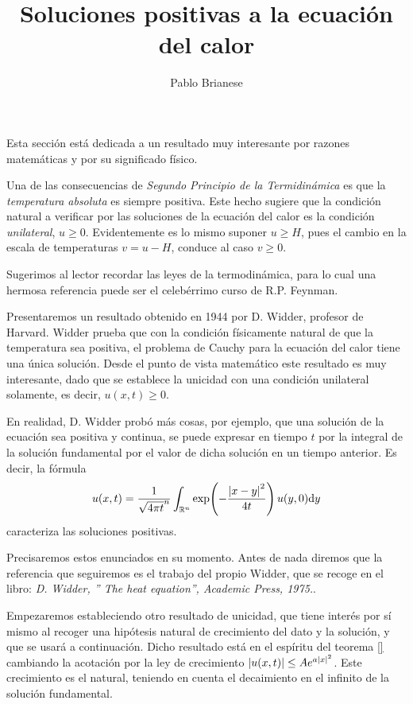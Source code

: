 \documentclass{article}
\title{Soluciones positivas a la ecuación del calor}
\author{Pablo Brianese}
\newcommand{\realNumbers}{\mathbb{R}}
\theoremstyle{definition}
\theoremstyle{remark}
\begin{document}
  \maketitle


  Esta sección está dedicada a un resultado muy interesante por razones matemáticas y por su significado físico.

  Una de las consecuencias de \emph{Segundo Principio de la Termidinámica} es que la \emph{temperatura absoluta} es siempre positiva.
  Este hecho sugiere que la condición natural a verificar por las soluciones de la ecuación del calor es la condición \emph{unilateral}, \(u \geq 0\).
  Evidentemente es lo mismo suponer \(u \geq H\), pues el cambio en la escala de temperaturas \(v = u - H\), conduce al caso \(v \geq 0\).

  Sugerimos al lector recordar las leyes de la termodinámica, para lo cual una hermosa referencia puede ser el celebérrimo curso de R.P. Feynman.

  Presentaremos un resultado obtenido en 1944 por D. Widder, profesor de Harvard.
  Widder prueba que con la condición físicamente natural de que la temperatura sea positiva, el problema de Cauchy para la ecuación del calor tiene una única solución.
  Desde el punto de vista matemático este resultado es muy interesante, dado que se establece la unicidad con una condición unilateral solamente, es decir, \(u(x, t) \geq 0\).

  En realidad, D. Widder probó más cosas, por ejemplo, que una solución de la ecuación sea positiva y continua, se puede expresar en tiempo \(t\) por la integral de la solución fundamental por el valor de dicha solución en un tiempo anterior.
  Es decir, la fórmula
  \begin{align}
    \label{equation:heatEquationRepresentationFormula}
    u(x, t)
    =
    \frac{1}{\sqrt{4 \pi t}^n} \int_{\realNumbers^n} \exp\!\left(- \frac{\abs{x - y}^2}{4 t}\right) u(y, 0) \dd y
  \end{align}
  caracteriza las soluciones positivas.

  Precisaremos estos enunciados en su momento.
  Antes de nada diremos que la referencia que seguiremos es el trabajo del propio Widder, que se recoge en el libro: \textit{D. Widder, ” The heat equation”, Academic Press, 1975.}.

  Empezaremos estableciendo otro resultado de unicidad, que tiene interés por sí mismo al recoger una hipótesis natural de crecimiento del dato y la solución, y que se usará a continuación.
  Dicho resultado está en el espíritu del teorema
  \ref{} %
  cambiando la acotación por la ley de crecimiento \(\abs{u(x, t)} \leq A e^{a \abs{x}^2}\).
  Este crecimiento es el natural, teniendo en cuenta el decaimiento en el infinito de la solución fundamental.
\end{document}
